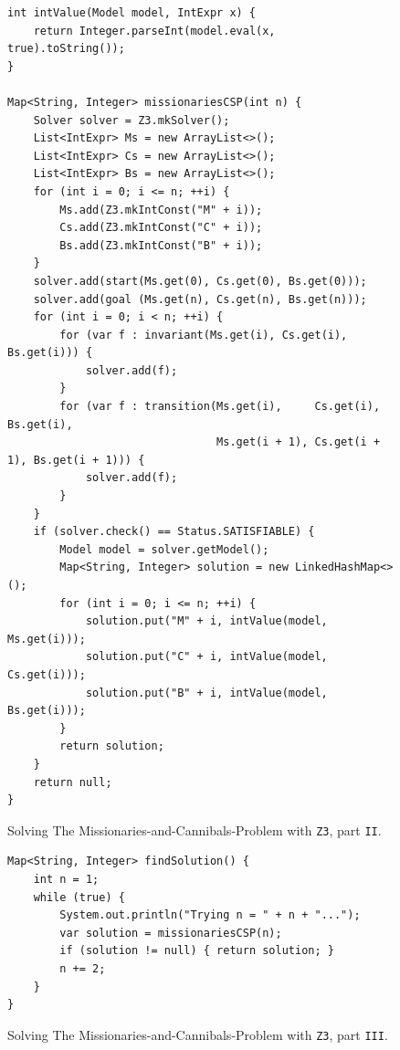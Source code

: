 \begin{figure}[!ht]
\centering
\begin{verbatim}
int intValue(Model model, IntExpr x) {
    return Integer.parseInt(model.eval(x, true).toString());
}

Map<String, Integer> missionariesCSP(int n) {
    Solver solver = Z3.mkSolver();
    List<IntExpr> Ms = new ArrayList<>();
    List<IntExpr> Cs = new ArrayList<>();
    List<IntExpr> Bs = new ArrayList<>();
    for (int i = 0; i <= n; ++i) {
        Ms.add(Z3.mkIntConst("M" + i));
        Cs.add(Z3.mkIntConst("C" + i));
        Bs.add(Z3.mkIntConst("B" + i));
    }
    solver.add(start(Ms.get(0), Cs.get(0), Bs.get(0)));
    solver.add(goal (Ms.get(n), Cs.get(n), Bs.get(n)));
    for (int i = 0; i < n; ++i) {
        for (var f : invariant(Ms.get(i), Cs.get(i), Bs.get(i))) {
            solver.add(f);
        }
        for (var f : transition(Ms.get(i),     Cs.get(i),     Bs.get(i),
                                Ms.get(i + 1), Cs.get(i + 1), Bs.get(i + 1))) {
            solver.add(f);
        }
    }
    if (solver.check() == Status.SATISFIABLE) {
        Model model = solver.getModel();
        Map<String, Integer> solution = new LinkedHashMap<>();
        for (int i = 0; i <= n; ++i) {
            solution.put("M" + i, intValue(model, Ms.get(i)));
            solution.put("C" + i, intValue(model, Cs.get(i)));
            solution.put("B" + i, intValue(model, Bs.get(i)));
        }
        return solution;
    } 
    return null;
}
\end{verbatim}
\vspace*{-0.3cm}
\caption{Solving The Missionaries-and-Cannibals-Problem with \texttt{Z3}, part \texttt{II}.}
\label{fig:Missionaries-Z3.ipynb-2}
\end{figure}

\begin{figure}[!ht]
\centering
\begin{verbatim}
Map<String, Integer> findSolution() {
    int n = 1;
    while (true) {
        System.out.println("Trying n = " + n + "...");
        var solution = missionariesCSP(n);
        if (solution != null) { return solution; }
        n += 2;
    }
}
\end{verbatim}
\vspace*{-0.3cm}
\caption{Solving The Missionaries-and-Cannibals-Problem with \texttt{Z3}, part \texttt{III}.}
\label{fig:Missionaries-Z3.ipynb-3}
\end{figure} %

